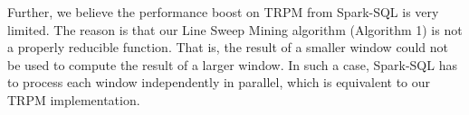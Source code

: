 {Further, we believe the performance boost on TRPM from Spark-SQL
is very limited. The reason is that our 
Line Sweep Mining algorithm (Algorithm 1) is not a 
properly reducible function. That is, the result of a 
smaller window could not be used to compute the result of a larger
window. In such a case, Spark-SQL has to process each
window independently in parallel, which is equivalent to our TRPM implementation.
%
%
%
}


